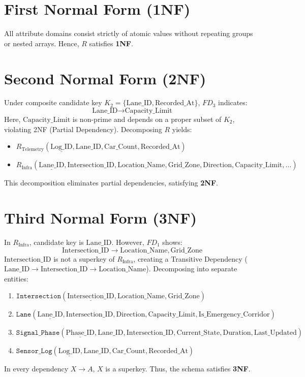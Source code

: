 \documentclass[11pt,a4paper]{report}
\begin{document}
\section{First Normal Form (1NF)}
All attribute domains consist strictly of atomic values without repeating groups or nested arrays. Hence, $R$ satisfies \textbf{1NF}.

\section{Second Normal Form (2NF)}
Under composite candidate key $K_2 = \{\text{Lane\_ID}, \text{Recorded\_At}\}$, $FD_3$ indicates:
$$\text{Lane\_ID} \rightarrow \text{Capacity\_Limit}$$
Here, $\text{Capacity\_Limit}$ is non-prime and depends on a proper subset of $K_2$, violating 2NF (Partial Dependency). Decomposing $R$ yields:
\begin{itemize}
    \item $R_{\text{Telemetry}}(\underline{\text{Log\_ID}}, \text{Lane\_ID}, \text{Car\_Count}, \text{Recorded\_At})$
    \item $R_{\text{Infra}}(\underline{\text{Lane\_ID}}, \text{Intersection\_ID}, \text{Location\_Name}, \text{Grid\_Zone}, \text{Direction}, \text{Capacity\_Limit}, \dots)$
\end{itemize}
This decomposition eliminates partial dependencies, satisfying \textbf{2NF}.

\section{Third Normal Form (3NF)}
In $R_{\text{Infra}}$, candidate key is $\text{Lane\_ID}$. However, $FD_1$ shows:
$$\text{Intersection\_ID} \rightarrow \text{Location\_Name}, \text{Grid\_Zone}$$
$\text{Intersection\_ID}$ is not a superkey of $R_{\text{Infra}}$, creating a Transitive Dependency ($\text{Lane\_ID} \rightarrow \text{Intersection\_ID} \rightarrow \text{Location\_Name}$). Decomposing into separate entities:
\begin{enumerate}
    \item $\texttt{Intersection}(\underline{\text{Intersection\_ID}}, \text{Location\_Name}, \text{Grid\_Zone})$
    \item $\texttt{Lane}(\underline{\text{Lane\_ID}}, \text{Intersection\_ID}, \text{Direction}, \text{Capacity\_Limit}, \text{Is\_Emergency\_Corridor})$
    \item $\texttt{Signal\_Phase}(\underline{\text{Phase\_ID}}, \text{Lane\_ID}, \text{Intersection\_ID}, \text{Current\_State}, \text{Duration}, \text{Last\_Updated})$
    \item $\texttt{Sensor\_Log}(\underline{\text{Log\_ID}}, \text{Lane\_ID}, \text{Car\_Count}, \text{Recorded\_At})$
\end{enumerate}
In every dependency $X \rightarrow A$, $X$ is a superkey. Thus, the schema satisfies \textbf{3NF}.
\end{document}
